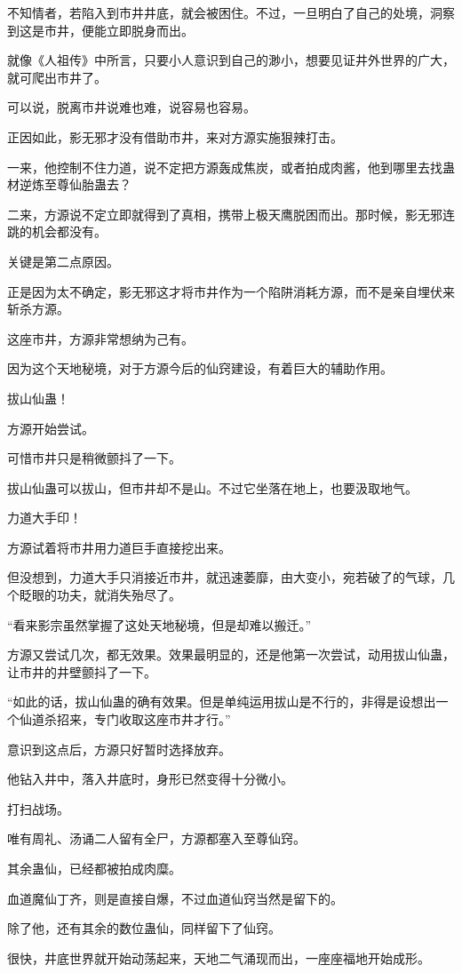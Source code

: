 \begin{this_body}
不知情者，若陷入到市井井底，就会被困住。不过，一旦明白了自己的处境，洞察到这是市井，便能立即脱身而出。

就像《人祖传》中所言，只要小人意识到自己的渺小，想要见证井外世界的广大，就可爬出市井了。

可以说，脱离市井说难也难，说容易也容易。

正因如此，影无邪才没有借助市井，来对方源实施狠辣打击。

一来，他控制不住力道，说不定把方源轰成焦炭，或者拍成肉酱，他到哪里去找蛊材逆炼至尊仙胎蛊去？

二来，方源说不定立即就得到了真相，携带上极天鹰脱困而出。那时候，影无邪连跳的机会都没有。

关键是第二点原因。

正是因为太不确定，影无邪这才将市井作为一个陷阱消耗方源，而不是亲自埋伏来斩杀方源。

这座市井，方源非常想纳为己有。

因为这个天地秘境，对于方源今后的仙窍建设，有着巨大的辅助作用。

拔山仙蛊！

方源开始尝试。

可惜市井只是稍微颤抖了一下。

拔山仙蛊可以拔山，但市井却不是山。不过它坐落在地上，也要汲取地气。

力道大手印！

方源试着将市井用力道巨手直接挖出来。

但没想到，力道大手只消接近市井，就迅速萎靡，由大变小，宛若破了的气球，几个眨眼的功夫，就消失殆尽了。

“看来影宗虽然掌握了这处天地秘境，但是却难以搬迁。”

方源又尝试几次，都无效果。效果最明显的，还是他第一次尝试，动用拔山仙蛊，让市井的井壁颤抖了一下。

“如此的话，拔山仙蛊的确有效果。但是单纯运用拔山是不行的，非得是设想出一个仙道杀招来，专门收取这座市井才行。”

意识到这点后，方源只好暂时选择放弃。

他钻入井中，落入井底时，身形已然变得十分微小。

打扫战场。

唯有周礼、汤诵二人留有全尸，方源都塞入至尊仙窍。

其余蛊仙，已经都被拍成肉糜。

血道魔仙丁齐，则是直接自爆，不过血道仙窍当然是留下的。

除了他，还有其余的数位蛊仙，同样留下了仙窍。

很快，井底世界就开始动荡起来，天地二气涌现而出，一座座福地开始成形。


\end{this_body}
